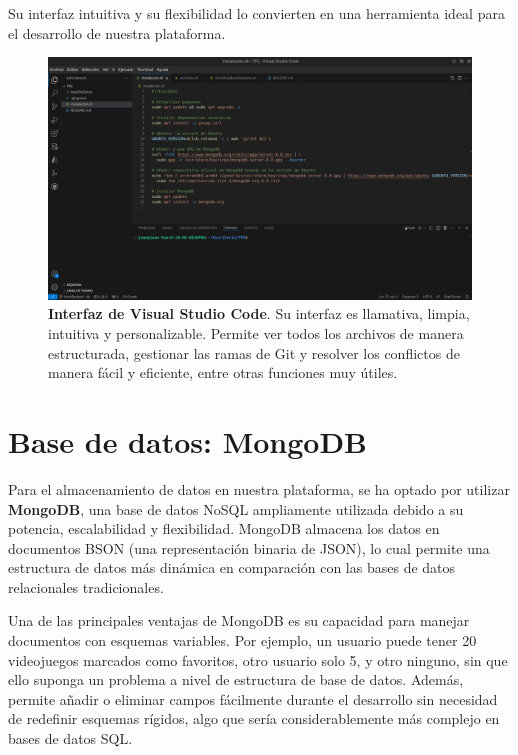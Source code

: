 Su interfaz intuitiva y su flexibilidad lo convierten en una herramienta ideal para el desarrollo de nuestra plataforma.

\begin{figure}[H]
     \centering
    \includegraphics[width=1\linewidth]{imagenes/vc.png}
     \caption[\textbf{Interfaz de Visual Studio Code}.]{\textbf{Interfaz de Visual Studio Code}. Su interfaz es llamativa, limpia, intuitiva y personalizable. Permite ver todos los archivos de manera estructurada, gestionar las ramas de Git y resolver los conflictos de manera fácil y eficiente, entre otras funciones muy útiles.}
     \label{fig:visualStudio-label}
 \end{figure}


\newpage

\section{Base de datos: MongoDB}

Para el almacenamiento de datos en nuestra plataforma, se ha optado por utilizar \textbf{MongoDB}, una base de datos NoSQL ampliamente utilizada debido a su potencia, escalabilidad y flexibilidad. MongoDB almacena los datos en documentos BSON (una representación binaria de JSON), lo cual permite una estructura de datos más dinámica en comparación con las bases de datos relacionales tradicionales.

Una de las principales ventajas de MongoDB es su capacidad para manejar documentos con esquemas variables. Por ejemplo, un usuario puede tener 20 videojuegos marcados como favoritos, otro usuario solo 5, y otro ninguno, sin que ello suponga un problema a nivel de estructura de base de datos. Además, permite añadir o eliminar campos fácilmente durante el desarrollo sin necesidad de redefinir esquemas rígidos, algo que sería considerablemente más complejo en bases de datos SQL.

